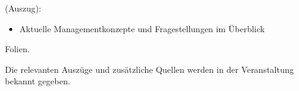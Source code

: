 \begin{course}
\begin{learningoutcomes}
\end{learningoutcomes}

\begin{content}
(Auszug):

 \begin{itemize}\item Aktuelle Managementkonzepte und Fragestellungen im Überblick  \end{itemize}
\end{content}

\begin{media}Folien.

\end{media}

\begin{literature}Die relevanten Auszüge und zusätzliche Quellen werden in der Veranstaltung bekannt gegeben.

\end{literature}



\end{course}